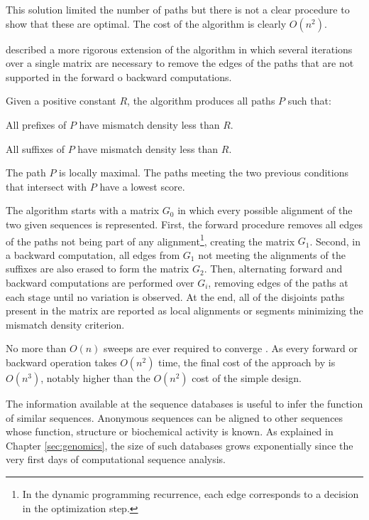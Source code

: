 This solution limited the number of paths but there is not a clear procedure to show that these are 
optimal. The cost of the algorithm is clearly $O(n^2)$.


\citet{sellers:1984a} described a more rigorous extension of the \citeauthor{goad:1982a} algorithm
in which several iterations over a single matrix are necessary to remove the edges of the paths that
are not supported in the forward o backward computations.

Given a positive constant $R$, the algorithm produces all paths $P$ such that:
\begin{menumerate}
\item
All prefixes of $P$ have mismatch density less than $R$.
\item
All suffixes of $P$ have mismatch density less than $R$.
\item
The path $P$ is locally maximal. The paths meeting the two previous conditions that
intersect with $P$ have a lowest score.
\end{menumerate}

The algorithm starts with a matrix $G_0$ in which every possible alignment of the two given sequences
is represented. First, the forward procedure removes all edges of the paths not being part of any 
alignment\footnote{In the dynamic programming recurrence, each edge corresponds to a decision in the 
optimization step.}, creating the matrix $G_1$. Second, in a backward computation, all edges from $G_1$ 
not meeting the alignments of the suffixes are also erased to form the matrix $G_2$. Then, alternating 
forward and backward computations are performed over $G_i$, removing edges of the paths at each stage 
until no variation is observed. At the end, all of the disjoints paths present in the matrix are reported
as local alignments or segments minimizing the mismatch density criterion.

No more than $O(n)$ sweeps are ever required to converge \citep{myers:1991a}. As every forward or 
backward operation takes $O(n^2)$ time, the final cost of the approach by \citeauthor{sellers:1984a} is 
$O(n^3)$, notably higher than the $O(n^2)$ cost of the simple \citeauthor{smith:1981c} design.

 

The information available at the sequence databases is useful to infer the function of similar
sequences. Anonymous sequences can be aligned to other sequences whose function, structure
or biochemical activity is known. As explained in Chapter \ref{sec:genomics}, the size of such 
databases grows exponentially since the very first days of computational sequence analysis.


